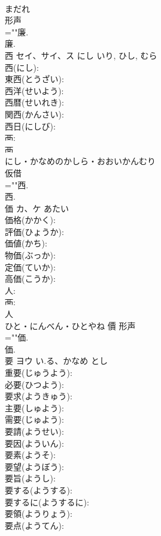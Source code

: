 \documentclass[8pt]{extreport}
\begin{document}
\begin{CJK}{UTF8}{min}
\\	まだれ	
\\	形声 
\\	=""廉.
\\	廉.
\\	西	セイ、サイ、ス	にし	いり, ひし, むら	
\\	西(にし): 
\\	東西(とうざい): 
\\	西洋(せいよう): 
\\	西暦(せいれき): 
\\	関西(かんさい): 
\\	西日(にしび): 
\\	襾: 
\\	襾	
\\	にし・かなめのかしら・おおいかんむり	
\\	仮借 
\\	=""西.
\\	西.
\\	価	カ、ケ	あたい		
\\	価格(かかく): 
\\	評価(ひょうか): 
\\	価値(かち): 
\\	物価(ぶっか): 
\\	定価(ていか): 
\\	高価(こうか): 
\\	人: 
\\	襾: 
\\	人	
\\	ひと・にんべん・ひとやね	價	形声 
\\	=""価.
\\	価.
\\	要	ヨウ	い.る、かなめ	とし	
\\	重要(じゅうよう): 
\\	必要(ひつよう): 
\\	要求(ようきゅう): 
\\	主要(しゅよう): 
\\	需要(じゅよう): 
\\	要請(ようせい): 
\\	要因(よういん): 
\\	要素(ようそ): 
\\	要望(ようぼう): 
\\	要旨(ようし): 
\\	要する(ようする): 
\\	要するに(ようするに): 
\\	要領(ようりょう): 
\\	要点(ようてん): 

\end{CJK}
\end{document}
